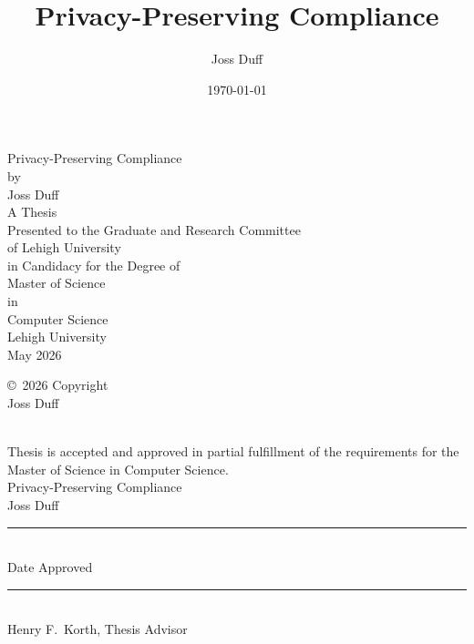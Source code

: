 \documentclass[9pt]{extreport}
\title{Privacy-Preserving Compliance}
\author{Joss Duff}
\date{\today}
\begin{document}

\begin{titlepage}
\thispagestyle{empty}
\Large
\begin{center}
\vspace*{1in}
{\Huge Privacy-Preserving Compliance}\\[4em]
by\\[4em]
Joss Duff\\[4em]
A Thesis\\
Presented to the Graduate and Research Committee\\
of Lehigh University\\
in Candidacy for the Degree of\\
Master of Science\\[2em]
in\\
Computer Science\\[4em]
Lehigh University\\[1em]
May 2026
\end{center}
\end{titlepage}

\setcounter{page}{2}
\thispagestyle{plain}
\Large
\vspace*{4in}
\begin{center}
\copyright\ 2026 Copyright \\Joss Duff
\end{center}
\clearpage

\thispagestyle{plain}
\\[2em]

\noindent Thesis is accepted and approved in partial fulfillment of the
requirements for the Master of Science in Computer Science.\\[3em]

\noindent Privacy-Preserving Compliance\\
Joss Duff\\[6em]

\noindent\rule{2.5in}{0.4pt}\\
Date Approved\\[5em]

\begin{flushright}
\rule{3in}{0.4pt}\\
Henry F.\ Korth, Thesis Advisor
\end{flushright}

\vspace{4em}
\end{document}
